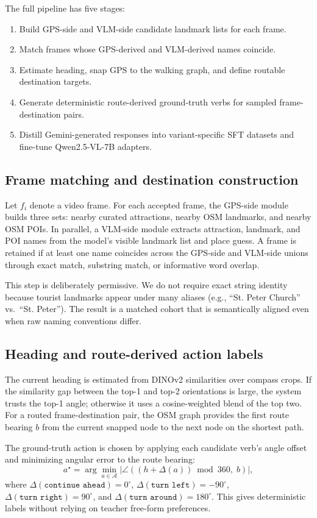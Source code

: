 \documentclass[10pt,twocolumn,letterpaper]{article}
\begin{document}
The full pipeline has five stages:
\begin{enumerate}
\item Build GPS-side and VLM-side candidate landmark lists for each frame.
\item Match frames whose GPS-derived and VLM-derived names coincide.
\item Estimate heading, snap GPS to the walking graph, and define routable destination targets.
\item Generate deterministic route-derived ground-truth verbs for sampled frame-destination pairs.
\item Distill Gemini-generated responses into variant-specific SFT datasets and fine-tune Qwen2.5-VL-7B adapters.
\end{enumerate}

\subsection{Frame matching and destination construction}
Let $f_i$ denote a video frame. For each accepted frame, the GPS-side module builds three sets: nearby curated attractions, nearby OSM landmarks, and nearby OSM POIs. In parallel, a VLM-side module extracts attraction, landmark, and POI names from the model's visible landmark list and place guess. A frame is retained if at least one name coincides across the GPS-side and VLM-side unions through exact match, substring match, or informative word overlap.

This step is deliberately permissive. We do not require exact string identity because tourist landmarks appear under many aliases (e.g., ``St. Peter Church'' vs.\ ``St. Peter''). The result is a matched cohort that is semantically aligned even when raw naming conventions differ.

\subsection{Heading and route-derived action labels}
The current heading is estimated from DINOv2 similarities over compass crops. If the similarity gap between the top-1 and top-2 orientations is large, the system trusts the top-1 angle; otherwise it uses a cosine-weighted blend of the top two. For a routed frame-destination pair, the OSM graph provides the first route bearing $b$ from the current snapped node to the next node on the shortest path.

The ground-truth action is chosen by applying each candidate verb's angle offset and minimizing angular error to the route bearing:
\begin{equation}
a^\star = \arg\min_{a \in \mathcal{A}}
\left|
\angle \left((h + \Delta(a)) \bmod 360,\; b\right)
\right|,
\end{equation}
where $\Delta(\texttt{continue ahead}) = 0^\circ$, $\Delta(\texttt{turn left}) = -90^\circ$, $\Delta(\texttt{turn right}) = 90^\circ$, and $\Delta(\texttt{turn around}) = 180^\circ$. This gives deterministic labels without relying on teacher free-form preferences.
\end{document}
